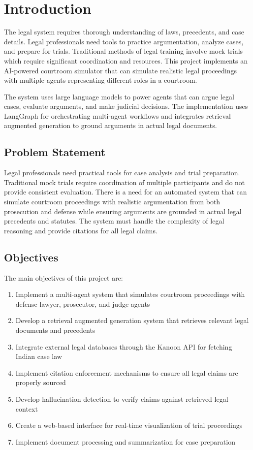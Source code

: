 \documentclass[12pt,singleside,a4paper]{article}
\begin{document}
\pagebreak
\tableofcontents
\pagebreak

\section{Introduction}
The legal system requires thorough understanding of laws, precedents, and case details. Legal professionals need tools to practice argumentation, analyze cases, and prepare for trials. Traditional methods of legal training involve mock trials which require significant coordination and resources. This project implements an AI-powered courtroom simulator that can simulate realistic legal proceedings with multiple agents representing different roles in a courtroom.

The system uses large language models to power agents that can argue legal cases, evaluate arguments, and make judicial decisions. The implementation uses LangGraph for orchestrating multi-agent workflows and integrates retrieval augmented generation to ground arguments in actual legal documents.

\subsection{Problem Statement}
Legal professionals need practical tools for case analysis and trial preparation. Traditional mock trials require coordination of multiple participants and do not provide consistent evaluation. There is a need for an automated system that can simulate courtroom proceedings with realistic argumentation from both prosecution and defense while ensuring arguments are grounded in actual legal precedents and statutes. The system must handle the complexity of legal reasoning and provide citations for all legal claims.

\subsection{Objectives}
The main objectives of this project are:
\begin{enumerate}
\item Implement a multi-agent system that simulates courtroom proceedings with defense lawyer, prosecutor, and judge agents
\item Develop a retrieval augmented generation system that retrieves relevant legal documents and precedents
\item Integrate external legal databases through the Kanoon API for fetching Indian case law
\item Implement citation enforcement mechanisms to ensure all legal claims are properly sourced
\item Develop hallucination detection to verify claims against retrieved legal context
\item Create a web-based interface for real-time visualization of trial proceedings
\item Implement document processing and summarization for case preparation
\end{enumerate}
\end{document}
